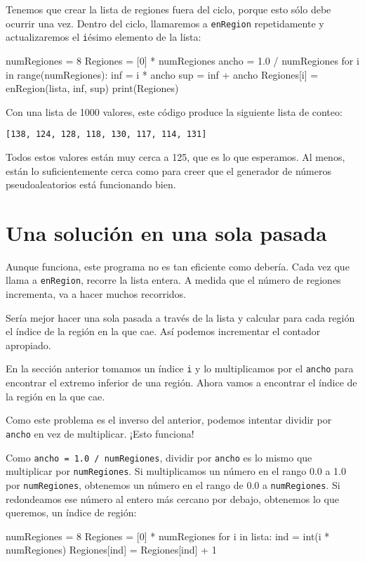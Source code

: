 Tenemos que crear la lista de regiones fuera del ciclo, porque esto
sólo debe ocurrir una vez. Dentro del ciclo, llamaremos a \texttt{enRegion}
repetidamente y actualizaremos el \texttt{i}ésimo elemento de la lista:
\begin{pythoncode}
numRegiones = 8
Regiones = [0] * numRegiones
ancho = 1.0 / numRegiones
for i in range(numRegiones):
  inf = i * ancho
  sup = inf + ancho
  Regiones[i] = enRegion(lista, inf, sup)
print(Regiones)
\end{pythoncode}

Con una lista de 1000 valores, este código produce la siguiente lista
de conteo:
\begin{verbatim}
[138, 124, 128, 118, 130, 117, 114, 131]
\end{verbatim}
Todos estos valores están muy cerca a 125, que es lo que esperamos.
Al menos, están lo suficientemente cerca como para creer que el generador
de números pseudoaleatorios está funcionando bien.

\section{Una solución en una sola pasada}

\label{histograma} 

Aunque funciona, este programa no es tan eficiente como debería. Cada
vez que llama a \texttt{enRegion}, recorre la lista entera. A medida
que el número de regiones incrementa, va a hacer muchos recorridos.

Sería mejor hacer una sola pasada a través de la lista y calcular
para cada región el índice de la región en la que cae. Así podemos
incrementar el contador apropiado.

En la sección anterior tomamos un índice \texttt{i} y lo multiplicamos
por el \texttt{ancho} para encontrar el extremo inferior de una región.
Ahora vamos a encontrar el índice de la región en la que cae.

Como este problema es el inverso del anterior, podemos intentar dividir
por \texttt{ancho} en vez de multiplicar. ¡Esto funciona!

Como \texttt{ancho = 1.0 / numRegiones}, dividir por \texttt{ancho}
es lo mismo que multiplicar por \texttt{numRegiones}. Si multiplicamos
un número en el rango 0.0 a 1.0 por \texttt{numRegiones}, obtenemos
un número en el rango de 0.0 a \texttt{numRegiones}. Si redondeamos
ese número al entero más cercano por debajo, obtenemos lo que queremos,
un índice de región:
\begin{pythoncode}
numRegiones = 8
Regiones = [0] * numRegiones
for i in lista:
  ind = int(i * numRegiones)
  Regiones[ind] = Regiones[ind] + 1
\end{pythoncode}

